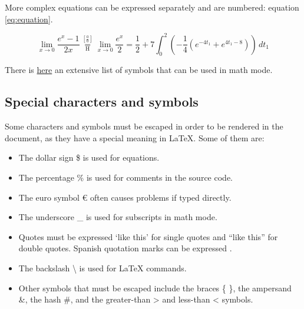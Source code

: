 More complex equations can be expressed separately and are numbered: equation \ref{eq:equation}.

\begin{equation}\label{eq:equation}
  \lim_{x\to 0}{\frac{e^x-1}{2x}}
  \overset{\left[\frac{0}{0}\right]}{\underset{\mathrm{H}}{=}}
  \lim_{x\to 0}{\frac{e^x}{2}}={\frac{1}{2}}
  +7 \int_0^2
  \left(
  -\frac{1}{4}\left(e^{-4t_1}+e^{4t_1-8}\right)
  \right)\,dt_1
\end{equation}

There is \href{http://www.yann-ollivier.org/latex/texsymbols.pdf}{here} an extensive list of symbols that can be used in math mode.

\subsection{Special characters and symbols}
Some characters and symbols must be escaped in order to be rendered in the document, as they have a special meaning in LaTeX. Some of them are:

\begin{itemize}
  \item The dollar sign \$ is used for equations.
  \item The percentage \% is used for comments in the source code.
  \item The euro symbol \euro{} often causes problems if typed directly.
  \item The underscore \_ is used for subscripts in math mode.
  \item Quotes must be expressed `like this' for single quotes and ``like this'' for double quotes. Spanish quotation marks can be expressed .
  \item The backslash \textbackslash{} is used for LaTeX commands.
  \item Other symbols that must be escaped include the braces \{ \}, the ampersand \&, the hash \#, and the greater-than \textgreater{} and less-than \textless{} symbols.
\end{itemize}